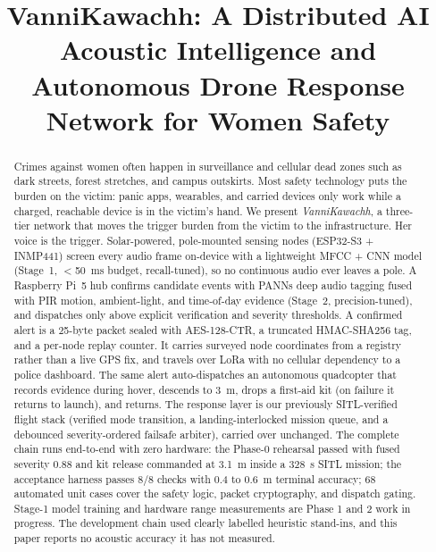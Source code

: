 \documentclass[conference]{IEEEtran}
\begin{document}
\title{VanniKawachh: A Distributed AI Acoustic Intelligence and
Autonomous Drone Response Network for Women Safety}

\author{
}

\maketitle

\begin{abstract}
Crimes against women often happen in surveillance and cellular dead
zones such as dark streets, forest stretches, and campus outskirts.
Most safety technology puts the burden on the victim: panic apps,
wearables, and carried devices only work while a charged, reachable
device is in the victim's hand. We present \emph{VanniKawachh}, a
three-tier network that moves the trigger burden from the victim to
the infrastructure. Her voice is the trigger. Solar-powered,
pole-mounted sensing nodes (ESP32-S3 + INMP441) screen every audio
frame on-device with a lightweight MFCC + CNN model (Stage~1,
$<$50~ms budget, recall-tuned), so no continuous audio ever leaves a
pole. A Raspberry Pi~5 hub confirms candidate events with PANNs deep
audio tagging fused with PIR motion, ambient-light, and time-of-day
evidence (Stage~2, precision-tuned), and dispatches only above
explicit verification and severity thresholds. A confirmed alert is a
25-byte packet sealed with AES-128-CTR, a truncated HMAC-SHA256 tag,
and a per-node replay counter. It carries surveyed node coordinates
from a registry rather than a live GPS fix, and travels over LoRa
with no cellular dependency to a police dashboard. The same alert
auto-dispatches an autonomous quadcopter that records evidence during
hover, descends to 3~m, drops a first-aid kit (on failure it returns
to launch), and returns. The response layer is our previously
SITL-verified flight stack (verified mode transition, a
landing-interlocked mission queue, and a debounced severity-ordered
failsafe arbiter), carried over unchanged. The complete chain runs
end-to-end with zero hardware: the Phase-0 rehearsal passed with
fused severity 0.88 and kit release commanded at 3.1~m inside a 328~s
SITL mission; the acceptance harness passes 8/8 checks with 0.4 to
0.6~m terminal accuracy; 68 automated unit cases cover the safety
logic, packet cryptography, and dispatch gating. Stage-1 model
training and hardware range measurements are Phase 1 and 2 work in
progress. The development chain used clearly labelled heuristic
stand-ins, and this paper reports no acoustic accuracy it has not
measured.
\end{abstract}
\end{document}
